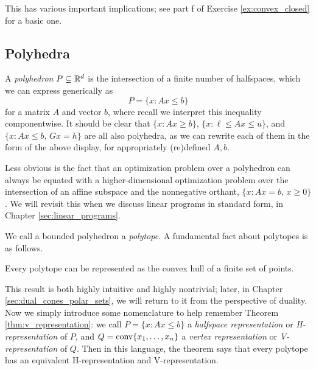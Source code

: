 
This has various important implications; see part f of Exercise
\ref{ex:convex_closed} for a basic one. 

\subsection{Polyhedra}
\label{sec:polyhedra}

A \emph{polyhedron} $P \subseteq \mathbb{R}^d$ is the intersection of a finite number of
halfspaces, which we can express generically as 
\[
P = \{x : Ax \leq b\}
\] 
for a matrix $A$ and vector $b$, where recall we interpret this inequality
componentwise. It should be clear that $\{x : Ax \geq b\}$, $\{x : \ell \leq Ax
\leq u\}$, and $\{x : Ax \leq b, \, Gx = h\}$ are all also polyhedra, as we
can rewrite each of them in the form of the above display, for appropriately
(re)defined $A,b$.

Less obvious is the fact that an optimization problem over a polyhedron can
always be equated with a higher-dimensional optimization problem over the
intersection of an affine subspace and the nonnegative orthant, $\{x : Ax=b, \,
x \geq 0 \}$. We will revisit this when we discuss linear programs in standard
form, in Chapter \ref{sec:linear_programs}. 

We call a bounded polyhedron a \emph{polytope}. A fundamental fact about
polytopes is as follows. 

\begin{Theorem}
\label{thm:v_representation}
Every polytope can be represented as the convex hull of a finite set of points. 
\end{Theorem}


This result is both highly intuitive and highly nontrivial; later, in Chapter
\ref{sec:dual_cones_polar_sets}, we will return to it from the perspective of
duality. Now we simply introduce some nomenclature to help
remember Theorem \ref{thm:v_representation}: we call $P = \{x : Ax \leq
b\}$ a \emph{halfspace representation} or \emph{H-representation} of $P$, and $Q
=  \operatorname{conv}\{x_1,\ldots,x_n\}$ a \emph{vertex representation} or  
\emph{V-representation} of $Q$. Then in this language, the theorem 
says that every polytope has an equivalent H-representation and
V-representation.   

